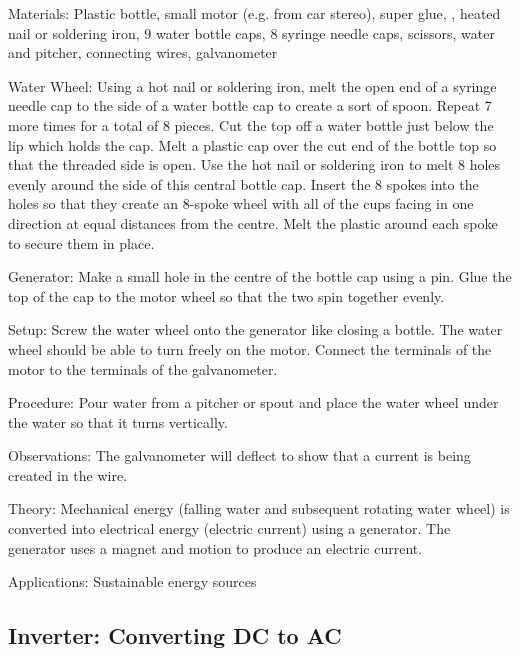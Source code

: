 \begin{multicols}{2}
\begin{description*}
\item[Materials:]{Plastic bottle, small motor (e.g. from car stereo), super glue, , heated nail or soldering iron, 9 water bottle caps, 8 syringe needle caps, scissors, water and pitcher, connecting wires, galvanometer}
\item[Water Wheel:]{Using a hot nail or soldering iron, melt the open end of a syringe needle cap to the side of a water bottle cap to create a sort of spoon. Repeat 7 more times for a total of 8 pieces. Cut the top off a water bottle just below the lip which holds the cap. Melt a plastic cap over the cut end of the bottle top so that the threaded side is open. Use the hot nail or soldering iron to melt 8 holes evenly around the side of this central bottle cap. Insert the 8 spokes into the holes so that they create an 8-spoke wheel with all of the cups facing in one direction at equal distances from the centre. Melt the plastic around each spoke to secure them in place.}
\item[Generator:]{Make a small hole in the centre of the bottle cap using a pin. Glue the top of the cap to the motor wheel so that the two spin together evenly.}
\item[Setup:]{Screw the water wheel onto the generator like closing a bottle. The water wheel should be able to turn freely on the motor. Connect the terminals of the motor to the terminals of the galvanometer.}
\item[Procedure:]{Pour water from a pitcher or spout and place the water wheel under the water so that it turns vertically.}
\item[Observations:]{The galvanometer will deflect to show that a current is being created in the wire.}
\item[Theory:]{Mechanical energy (falling water and subsequent rotating water wheel) is converted into electrical energy (electric current) using a generator. The generator uses a magnet and motion to produce an electric current.}
\item[Applications:]{Sustainable energy sources}
\end{description*}

\subsection{Inverter: Converting DC to AC} \label{sub:inverter}


\end{multicols}
